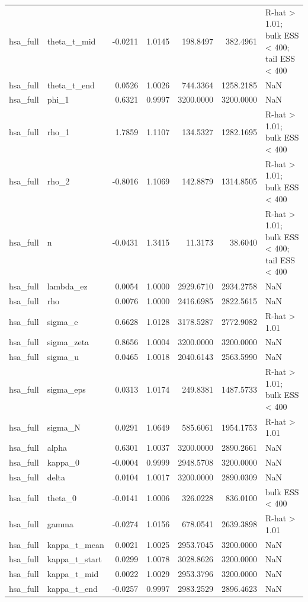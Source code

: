 \begin{tabular}{llrrrrl}
hsa\_full & theta\_t\_mid & -0.0211 & 1.0145 & 198.8497 & 382.4961 & R-hat > 1.01; bulk ESS < 400; tail ESS < 400 \\
hsa\_full & theta\_t\_end & 0.0526 & 1.0026 & 744.3364 & 1258.2185 & NaN \\
hsa\_full & phi\_1 & 0.6321 & 0.9997 & 3200.0000 & 3200.0000 & NaN \\
hsa\_full & rho\_1 & 1.7859 & 1.1107 & 134.5327 & 1282.1695 & R-hat > 1.01; bulk ESS < 400 \\
hsa\_full & rho\_2 & -0.8016 & 1.1069 & 142.8879 & 1314.8505 & R-hat > 1.01; bulk ESS < 400 \\
hsa\_full & n & -0.0431 & 1.3415 & 11.3173 & 38.6040 & R-hat > 1.01; bulk ESS < 400; tail ESS < 400 \\
hsa\_full & lambda\_ez & 0.0054 & 1.0000 & 2929.6710 & 2934.2758 & NaN \\
hsa\_full & rho & 0.0076 & 1.0000 & 2416.6985 & 2822.5615 & NaN \\
hsa\_full & sigma\_e & 0.6628 & 1.0128 & 3178.5287 & 2772.9082 & R-hat > 1.01 \\
hsa\_full & sigma\_zeta & 0.8656 & 1.0004 & 3200.0000 & 3200.0000 & NaN \\
hsa\_full & sigma\_u & 0.0465 & 1.0018 & 2040.6143 & 2563.5990 & NaN \\
hsa\_full & sigma\_eps & 0.0313 & 1.0174 & 249.8381 & 1487.5733 & R-hat > 1.01; bulk ESS < 400 \\
hsa\_full & sigma\_N & 0.0291 & 1.0649 & 585.6061 & 1954.1753 & R-hat > 1.01 \\
hsa\_full & alpha & 0.6301 & 1.0037 & 3200.0000 & 2890.2661 & NaN \\
hsa\_full & kappa\_0 & -0.0004 & 0.9999 & 2948.5708 & 3200.0000 & NaN \\
hsa\_full & delta & 0.0104 & 1.0017 & 3200.0000 & 2890.0309 & NaN \\
hsa\_full & theta\_0 & -0.0141 & 1.0006 & 326.0228 & 836.0100 & bulk ESS < 400 \\
hsa\_full & gamma & -0.0274 & 1.0156 & 678.0541 & 2639.3898 & R-hat > 1.01 \\
hsa\_full & kappa\_t\_mean & 0.0021 & 1.0025 & 2953.7045 & 3200.0000 & NaN \\
hsa\_full & kappa\_t\_start & 0.0299 & 1.0078 & 3028.8626 & 3200.0000 & NaN \\
hsa\_full & kappa\_t\_mid & 0.0022 & 1.0029 & 2953.3796 & 3200.0000 & NaN \\
hsa\_full & kappa\_t\_end & -0.0257 & 0.9997 & 2983.2529 & 2896.4623 & NaN \\

\end{tabular}

